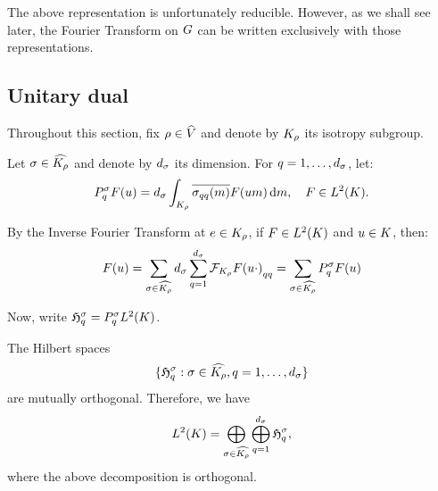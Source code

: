 The above representation is unfortunately reducible.
However, as we shall see later, the Fourier Transform on $\Group$ can be written exclusively with those representations.

\subsection{Unitary dual}
\label{subsection:unitary_dual}

Throughout this section, fix $\rho \in \dualGroup{V}$
and denote by $\IsotropySubgroup{\CompactGroup}{\rho}$ its isotropy subgroup.

Let $\sigma \in \dualGroup{\IsotropySubgroup{\CompactGroup}{\rho}}$ and denote by $\dimRep{\sigma}$ its dimension.
For $q = 1, \dots, \dimRep{\sigma}$, let:
\begin{align}
    P^\sigma_q F(u) = \dimRep{\sigma} \int_\IsotropySubgroup{\CompactGroup}{\rho} \conj{\sigma_{qq}(m)} F(u m) \dd m,
    \quad F \in \Lebesgue{2}{\CompactGroup}.
\end{align}

By the Inverse Fourier Transform at $e \in \IsotropySubgroup{\CompactGroup}{\rho}$,
if $F \in \Lebesgue{2}{\CompactGroup}$ and $u \in \CompactGroup$, then:
\begin{align}
    F(u)
    = \sum_{\sigma \in \dualGroup{\IsotropySubgroup{\CompactGroup}{\rho}}} \dimRep{\sigma} \sum_{q = 1}^{\dimRep{\sigma}} {\Fourier[\IsotropySubgroup{\CompactGroup}{\rho}]{F(u \dummy)}}_{qq}
    = \sum_{\sigma \in \dualGroup{\IsotropySubgroup{\CompactGroup}{\rho}}} P^\sigma_q F(u)
\end{align}

Now, write $\Hilbert{\sigma}{q} = P^\sigma_q \Lebesgue{2}{\CompactGroup}$.

\begin{lemma}
    The Hilbert spaces
    \begin{align*}
        \{\Hilbert{\sigma}{q} : \sigma \in \dualGroup{\IsotropySubgroup{\CompactGroup}{\rho}}, q = 1, \dots, \dimRep{\sigma} \}
    \end{align*}
    are mutually orthogonal.
    Therefore, we have
    \begin{align*}
        \Lebesgue{2}{K} = \bigoplus_{\sigma \in \dualGroup{\IsotropySubgroup{\CompactGroup}{\rho}}} \bigoplus_{q = 1}^{\dimRep{\sigma}} \Hilbert{\sigma}{q},
    \end{align*}
    where the above decomposition is orthogonal.
\end{lemma}

